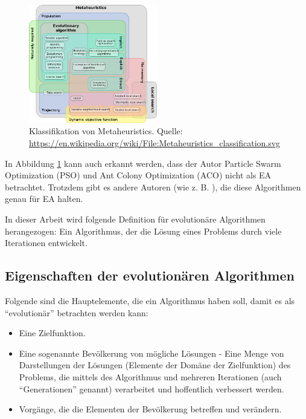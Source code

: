\documentclass[twoside,twocolumn]{article}
\begin{document}
\begin{figure}
\caption{Klassifikation von Metaheuristics. Quelle: \url{https://en.wikipedia.org/wiki/File:Metaheuristics_classification.svg}}
\label{fig:metaheuristics}
\centering
\includegraphics[width=0.5\textwidth]{images/metaheuristics_classification.png}
\end{figure}

In Abbildung \ref{fig:metaheuristics} kann auch erkannt werden, dass der Autor Particle Swarm Optimization (PSO) und Ant Colony Optimization (ACO) nicht als EA betrachtet. Trotzdem gibt es andere Autoren (wie z. B. \cite{wiley_evolutionary}), die diese Algorithmen genau für EA halten.\par

In dieser Arbeit wird folgende Definition für evolutionäre Algorithmen herangezogen: Ein Algorithmus, der die Lösung eines Problems durch viele Iterationen entwickelt.

\subsection{Eigenschaften der evolutionären Algorithmen}
Folgende sind die Hauptelemente, die ein Algorithmus haben soll, damit es als \enquote{evolutionär} betrachten werden kann:

\begin{itemize}
\item{Eine Zielfunktion.}
\item{Eine sogenannte Bevölkerung von mögliche Lösungen - Eine Menge von Darstellungen der Lösungen (Elemente der Domäne der Zielfunktion) des Problems, die mittels des Algorithmus und mehreren Iterationen (auch \enquote{Generationen} genannt) verarbeitet und hoffentlich verbessert werden.}
\item{Vorgänge, die die Elementen der Bevölkerung betreffen und verändern.}
\end{itemize}
\end{document}
